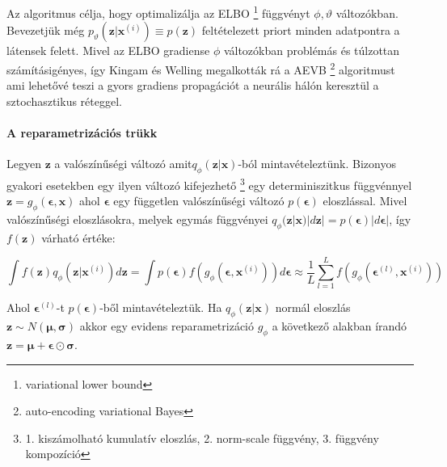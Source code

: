 \documentclass[12pt, english]{article}
\begin{document}
\vspace{4mm}

\par Az algoritmus célja, hogy optimalizálja az ELBO \footnote{variational lower bound} függvényt $\phi, \vartheta$ változókban. Bevezetjük még $p_{\vartheta}(\bm{z} | \bm{x}^{(i)}) \equiv p(\bm{z})$ feltételezett priort minden adatpontra a látensek felett. Mivel az ELBO gradiense $\phi$ változókban problémás és túlzottan számításigényes, így Kingam és Welling megalkották rá a AEVB \footnote{auto-encoding variational Bayes} algoritmust ami lehetővé teszi a gyors gradiens propagációt a neurális hálón keresztül a sztochasztikus réteggel.

\vspace{4mm}

\paragraph{A reparametrizációs trükk \newline \newline}

\vspace{4mm}

\par Legyen $\bm{z}$ a valószínűségi változó amit$   q_{\phi}(\bm{z} | \bm{x})$-ból mintavételeztünk. Bizonyos gyakori esetekben egy ilyen változó kifejezhető \footnote{1. kiszámolható kumulatív eloszlás, 2. norm-scale függvény, 3. függvény kompozíció} egy determiniszitkus függvénnyel $\bm{z} = g_{\phi}(\bm{\epsilon}, \bm{x})$ ahol $\bm{\epsilon}$ egy független valószínűségi változó $p(\bm{\epsilon})$ eloszlással. Mivel valószínűségi eloszlásokra, melyek egymás függvényei $q_{\phi}(\bm{z} | \bm{x})|d\bm{z}| = p(\bm{\epsilon})|d\bm{\epsilon}|$, így $f(\bm{z})$ várható értéke:

\vspace{4mm}

\begin{equation}
    \int f(\bm{z})q_{\phi}(\bm{z} | \bm{x}^{(i)})d\bm{z} = \int p(\bm{\epsilon})f(g_{\phi}(\bm{\epsilon}, \bm{x}^{(i)})) d\bm{\epsilon} \approx \frac{1}{L}\sum_{l=1}^{L}f(g_{\phi}(\bm{\epsilon}^{(l)}, \bm{x}^{(i)}))
\end{equation}

\vspace{4mm}

\par Ahol $\bm{\epsilon}^{(l)}$-t $p(\bm{\epsilon})$-ből mintavételeztük. Ha $q_{\phi}(\bm{z} | \bm{x})$ normál eloszlás $\bm{z} \sim N(\bm{\mu}, \bm{\sigma})$ akkor egy evidens reparametrizáció $g_{\phi}$ a következő alakban írandó $\bm{z} = \bm{\mu} + \bm{\epsilon} \odot \bm{\sigma}$.
\end{document}
